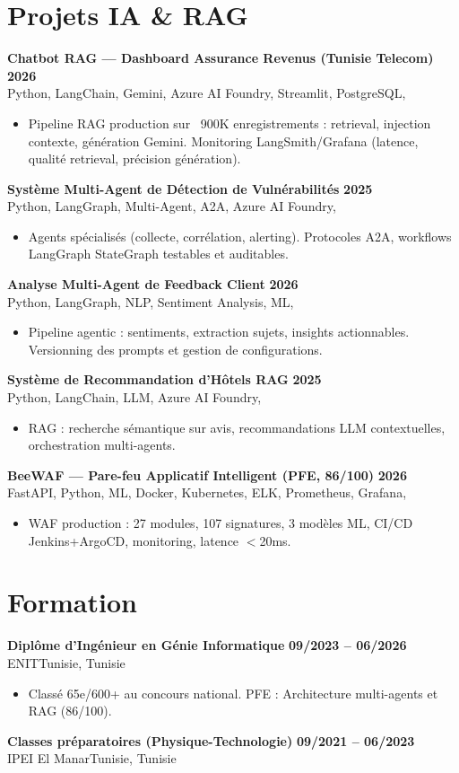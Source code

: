 \documentclass[a4paper,10pt]{article}
\newcommand{\cventry}[4]{\textbf{#1} \hfill \textbf{#4}\\[0.5pt]#2{\ifx\relax#3\relax\else, #3\fi}\par\vspace{1pt}}
\begin{document}
\section{Projets IA \& RAG}
\cventry{Chatbot RAG --- Dashboard Assurance Revenus (Tunisie Telecom)}{Python, LangChain, Gemini, Azure AI Foundry, Streamlit, PostgreSQL}{}{2026}
\begin{itemize}
  \item Pipeline RAG production sur ~900K enregistrements : retrieval, injection contexte, génération Gemini. Monitoring LangSmith/Grafana (latence, qualité retrieval, précision génération).
\end{itemize}
\cventry{Système Multi-Agent de Détection de Vulnérabilités}{Python, LangGraph, Multi-Agent, A2A, Azure AI Foundry}{}{2025}
\begin{itemize}
  \item Agents spécialisés (collecte, corrélation, alerting). Protocoles A2A, workflows LangGraph StateGraph testables et auditables.
\end{itemize}
\cventry{Analyse Multi-Agent de Feedback Client}{Python, LangGraph, NLP, Sentiment Analysis, ML}{}{2026}
\begin{itemize}
  \item Pipeline agentic : sentiments, extraction sujets, insights actionnables. Versionning des prompts et gestion de configurations.
\end{itemize}
\cventry{Système de Recommandation d'Hôtels RAG}{Python, LangChain, LLM, Azure AI Foundry}{}{2025}
\begin{itemize}
  \item RAG : recherche sémantique sur avis, recommandations LLM contextuelles, orchestration multi-agents.
\end{itemize}
\cventry{BeeWAF --- Pare-feu Applicatif Intelligent (PFE, 86/100)}{FastAPI, Python, ML, Docker, Kubernetes, ELK, Prometheus, Grafana}{}{2026}
\begin{itemize}
  \item WAF production : 27 modules, 107 signatures, 3 modèles ML, CI/CD Jenkins+ArgoCD, monitoring, latence $<$20ms.
\end{itemize}

\section{Formation}
\cventry{Diplôme d'Ingénieur en Génie Informatique}{ENIT}{Tunisie}{09/2023 -- 06/2026}
\begin{itemize}
  \item Classé 65e/600+ au concours national. PFE : Architecture multi-agents et RAG (86/100).
\end{itemize}
\cventry{Classes préparatoires (Physique-Technologie)}{IPEI El Manar}{Tunisie}{09/2021 -- 06/2023}
\end{document}
